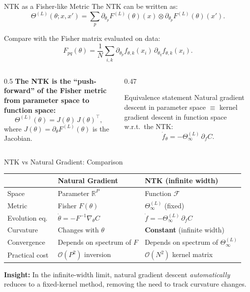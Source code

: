\documentclass[aspectratio=169, 10pt]{beamer}
\newcommand{\NTK}{\Theta^{(L)}_\infty}
\newcommand{\R}{\mathbb{R}}
\newcommand{\highlight}[1]{\textcolor{blue!70!black}{\textbf{#1}}}
\begin{document}
\begin{frame}{NTK as a Fisher-like Metric}
  The NTK can be written as:
  \[
    \Theta^{(L)}(\theta;x,x') = \sum_p \partial_{\theta_p}F^{(L)}(\theta)(x) \otimes \partial_{\theta_p}F^{(L)}(\theta)(x').
  \]

  Compare with the Fisher matrix evaluated on data:
  \[
    F_{pq}(\theta) = \frac{1}{N}\sum_{i,k} \partial_{\theta_p}f_{\theta,k}(x_i)\,\partial_{\theta_q}f_{\theta,k}(x_i).
  \]

  \vspace{0.3em}
  \begin{columns}[T]
    \begin{column}{0.5\textwidth}
      \textbf{The NTK is the ``push-forward'' of the Fisher metric from parameter space to function space:}
      \[
        \Theta^{(L)}(\theta) = J(\theta)\,J(\theta)^\top,
      \]
      where $J(\theta) = \partial_\theta F^{(L)}(\theta)$ is the Jacobian.
    \end{column}
    \begin{column}{0.47\textwidth}
      \begin{block}{Equivalence statement}
        Natural gradient descent in parameter space $\equiv$ kernel gradient descent in function space w.r.t.\ the NTK:
        \[
          \dot f_\theta = -\NTK\, \partial_f C.
        \]
      \end{block}
    \end{column}
  \end{columns}
\end{frame}

\begin{frame}{NTK vs Natural Gradient: Comparison}
  \renewcommand{\arraystretch}{1.4}
  \begin{tabular}{lll}
    \toprule
    & \textbf{Natural Gradient} & \textbf{NTK (infinite width)} \\
    \midrule
    Space & Parameter $\R^P$ & Function $\mathcal{F}$ \\
    Metric & Fisher $F(\theta)$ & $\NTK$ (fixed) \\
    Evolution eq.\ & $\dot\theta = -F^{-1}\nabla_\theta C$ & $\dot f = -\NTK\,\partial_f C$ \\
    Curvature & Changes with $\theta$ & \highlight{Constant} (infinite width) \\
    Convergence & Depends on spectrum of $F$ & Depends on spectrum of $\NTK$ \\
    Practical cost & $\mathcal{O}(P^2)$ inversion & $\mathcal{O}(N^2)$ kernel matrix \\
    \bottomrule
  \end{tabular}

  \vspace{0.5em}
  \textbf{Insight:} In the infinite-width limit, natural gradient descent \emph{automatically} reduces to a fixed-kernel method, removing the need to track curvature changes.
\end{frame}
\end{document}

